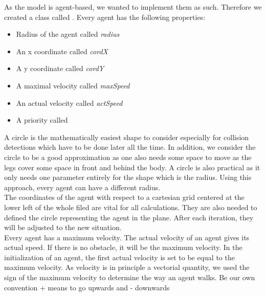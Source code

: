 
As the model is agent-based, we wanted to implement them as such. Therefore we created a class called . Every agent has the following properties:
\begin{itemize}
	\item Radius of the agent called \textit{radius}
	\item An x coordinate called \textit{cordX}
	\item A y coordinate called \textit{cordY}
	\item A maximal velocity called \textit{maxSpeed}
	\item An actual velocity called \textit{actSpeed}
	\item A priority called 
\end{itemize}
\noi A circle is the mathematically easiest shape to consider especially for collision detections which have to be done later all the time. In addition, we consider the circle to be a good approximation as one also needs some space to move as the legs cover some space in front and behind the body. A circle is also practical as it only needs one parameter entirely for the shape which is the radius. Using this approach, every agent can have a different radius.\\

\noi The coordinates of the agent with respect to a cartesian grid centered at the lower left of the whole filed are vital for all calculations. They are also needed to defined the circle representing the agent in the plane. After each iteration, they will be adjusted to the new situation.\\

\noi Every agent has a maximum velocity. The actual velocity of an agent gives its actual speed. If there is no obstacle, it will be the maximum velocity. In the initialization of an agent, the first actual velocity is set to be equal to the maximum velocity. As velocity is in principle a vectorial quantity, we used the sign of the maximum velocity to determine the way an agent walks. Be our own convention + means to go upwards and - downwards 




